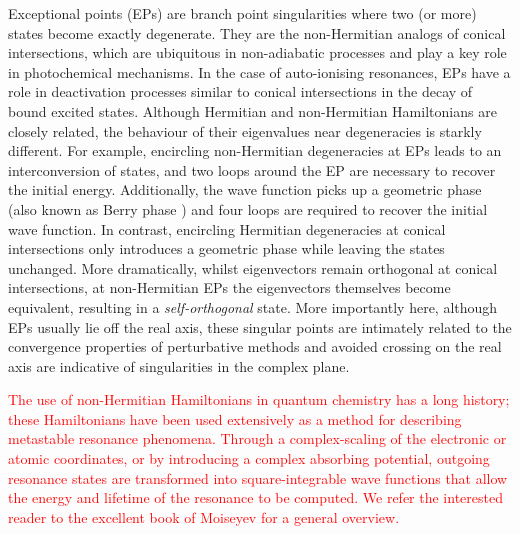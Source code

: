 \documentclass[aps,prb,reprint,noshowkeys,superscriptaddress]{revtex4-1}
\newcommand{\titou}[1]{\textcolor{red}{#1}}
\begin{document}
Exceptional points (EPs) are branch point singularities where two (or more) states become exactly degenerate. \cite{MoiseyevBook,Heiss_1988,Heiss_1990,Heiss_1999,Berry_2011,Heiss_2012,Heiss_2016,Benda_2018}
They are the non-Hermitian analogs of conical intersections, \cite{Yarkony_1996} which are ubiquitous in non-adiabatic processes and play a key role in photochemical mechanisms.
In the case of auto-ionising resonances, EPs have a role in deactivation processes similar to conical intersections in the decay of bound excited states. \cite{Benda_2018}
Although Hermitian and non-Hermitian Hamiltonians are closely related, the behaviour of their eigenvalues near degeneracies is starkly different.
For example, encircling non-Hermitian degeneracies at EPs leads to an interconversion of states, and two loops around the EP are necessary to recover the initial energy. \cite{MoiseyevBook,Heiss_2016,Benda_2018}
Additionally, the wave function picks up a geometric phase (also known as Berry phase \cite{Berry_1984}) and four loops are required to recover the initial wave function.
In contrast, encircling Hermitian degeneracies at conical intersections only introduces a geometric phase while leaving the states unchanged.
More dramatically, whilst eigenvectors remain orthogonal at conical intersections, at non-Hermitian EPs the eigenvectors themselves become equivalent, resulting in a \textit{self-orthogonal} state. \cite{MoiseyevBook}
More importantly here, although EPs usually lie off the real axis, these singular points are intimately related to the convergence properties of perturbative methods and avoided crossing on the real axis are indicative of singularities in the complex plane. \cite{BenderBook,Olsen_1996,Olsen_2000,Olsen_2019,Mihalka_2017a,Mihalka_2017b,Mihalka_2019}

\titou{The use of non-Hermitian Hamiltonians in quantum chemistry has a long history; these Hamiltonians have been used extensively as a method for describing metastable resonance phenomena. \cite{MoiseyevBook}
Through a complex-scaling of the electronic or atomic coordinates,\cite{Moiseyev_1998} or by introducing a complex absorbing potential,\cite{Riss_1993,Ernzerhof_2006,Benda_2018} outgoing resonance states are transformed into square-integrable wave functions that allow the energy and lifetime of the resonance to be computed.
We refer the interested reader to the excellent book of Moiseyev for a general overview. \cite{MoiseyevBook}}
\end{document}
